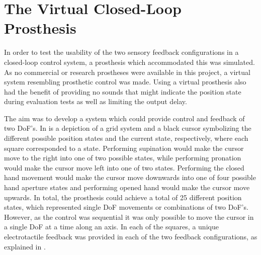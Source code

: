 
\section{The Virtual Closed-Loop Prosthesis} \label{sec:vp}

In order to test the usability of the two sensory feedback configurations in a closed-loop control system, a prosthesis which accommodated this was simulated. As no commercial or research prostheses were available in this project, a virtual system resembling prosthetic control was made. Using a virtual prosthesis also had the benefit of providing no sounds that might indicate the position state during evaluation tests as well as limiting the output delay.

The aim was to develop a system which could provide control and feedback of two DoF's. In  is a depiction of a grid system and a black cursor symbolizing the different possible position states and the current state, respectively, where each square corresponded to a state. Performing supination would make the cursor move to the right into one of two possible states, while performing pronation would make the cursor move left into one of two states. Performing the closed hand movement would make the cursor move downwards into one of four possible hand aperture states and performing opened hand would make the cursor move upwards. In total, the prosthesis could achieve a total of 25 different position states, which represented single DoF movements or combinations of two DoF's. However, as the control was sequential it was only possible to move the cursor in a single DoF at a time along an axis. In each of the squares, a unique electrotactile feedback was provided in each of the two feedback configurations, as explained in .
     

